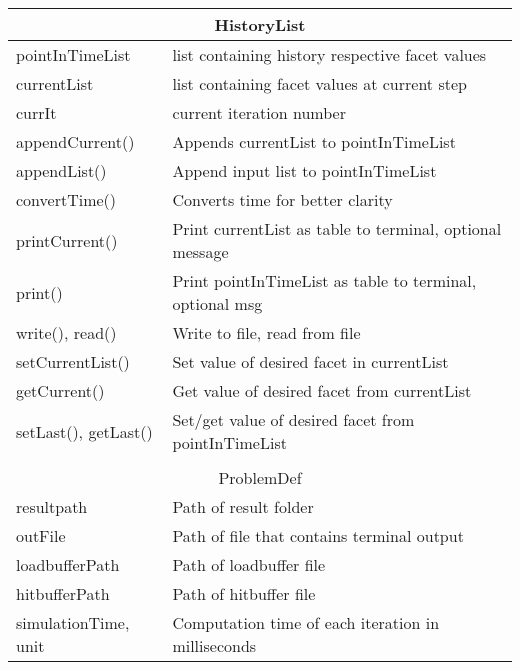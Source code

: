 \begin{center}
\begin{tabular}{|l|l|}
\hline
\multicolumn{2}{|c|}{\rule{0pt}{3ex}HistoryList}\\
\hline
\rule{0pt}{3ex} pointInTimeList& list containing history respective facet values\\
\rule{0pt}{3ex} currentList& list containing facet values at current step\\
\rule{0pt}{3ex} currIt& current iteration number\\
\hline
\rule{0pt}{3ex} appendCurrent()& Appends currentList to pointInTimeList\\
\rule{0pt}{3ex} appendList()& Append input list to pointInTimeList\\
\rule{0pt}{3ex} convertTime()& Converts time for better clarity\\
\rule{0pt}{3ex} printCurrent()& Print currentList as table to terminal, optional message\\
\rule{0pt}{3ex} print()& Print pointInTimeList as table to terminal, optional msg\\
\rule{0pt}{3ex} write(), read()& Write to file, read from file\\
\rule{0pt}{3ex} setCurrentList()& Set value of desired facet in currentList\\
\rule{0pt}{3ex} getCurrent()& Get value of desired facet from currentList\\
\rule{0pt}{3ex} setLast(), getLast()& Set/get value of desired facet from pointInTimeList\\
\hline
\multicolumn{2}{l}{}\\
\hline
\multicolumn{2}{|c|}{\rule{0pt}{3ex}ProblemDef}\\
\hline
\rule{0pt}{3ex} resultpath& Path of result folder\\
\rule{0pt}{3ex} outFile& Path of file that contains terminal output\\
\rule{0pt}{3ex} loadbufferPath& Path of loadbuffer file\\
\rule{0pt}{3ex} hitbufferPath& Path of hitbuffer file\\
\rule{0pt}{3ex} simulationTime, unit& \multirow{2}{*}{Computation time of each iteration in milliseconds}\\

\end{tabular}
\end{center}
